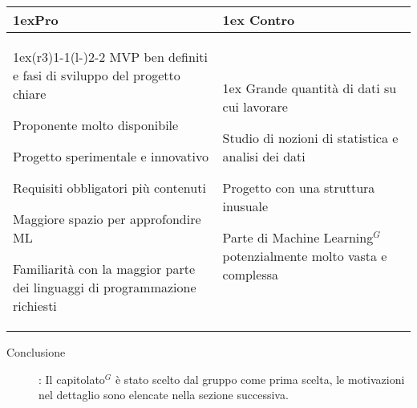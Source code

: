 \begin{table}[h]
\begin{tabularx}{\linewidth}{>{\parskip1ex}X@{\kern4\tabcolsep}>{\parskip1ex}X}
\hfil\bfseries Pro
&
\hfil\bfseries Contro
\\\cmidrule(r{3\tabcolsep}){1-1}\cmidrule(l{-\tabcolsep}){2-2}
MVP ben definiti e fasi di sviluppo del progetto chiare \par
Proponente molto disponibile \par
Progetto sperimentale e innovativo \par
Requisiti obbligatori più contenuti \par 
Maggiore spazio per approfondire ML \par
Familiarità con la maggior parte dei linguaggi di programmazione richiesti
&
Grande quantità di dati su cui lavorare \par
Studio di nozioni di statistica e analisi dei dati \par
Progetto con una struttura inusuale \par
Parte di Machine Learning$^{G}$ potenzialmente molto vasta e complessa \\
\end{tabularx}
\end{table}
\begin{description}
	\item [Conclusione]: Il capitolato$^{G}$ è stato scelto dal gruppo come prima scelta, le motivazioni nel dettaglio sono elencate nella sezione successiva.
\end{description}

\vspace{1cm}

